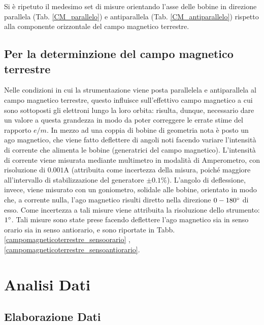 \documentclass[]{article}
\let\oldsection\section%
\renewcommand{\section}{%
	\renewcommand{\theequation}{\thesection.\arabic{equation}}%
	\oldsection}%
\let\oldsubsection\subsection%
\renewcommand{\subsection}{%
	\renewcommand{\theequation}{\thesubsection.\arabic{equation}}%
	\oldsubsection}%
\begin{document}
    Si è ripetuto il medesimo set di misure orientando l'asse delle bobine in direzione parallela (Tab. \ref{CM_parallelo}) e antiparallela (Tab. \ref{CM_antiparallelo}) rispetto alla componente orizzontale del campo magnetico terrestre.

    \subsection{Per la determinzione del campo magnetico terrestre}
    Nelle condizioni in cui la strumentazione viene posta parallelela e antiparallela al campo magnetico terrestre, questo influisce sull'effettivo campo magnetico a cui sono sottoposti gli elettroni lungo la loro orbita: risulta, dunque, necessario dare un valore a questa grandezza in modo da poter correggere le errate stime del rapporto $e/m$. In mezzo ad una coppia di bobine di geometria nota è posto un ago magnetico, che viene fatto deflettere di angoli noti facendo variare l'intensità di corrente che alimenta le bobine (generatrici del campo magnetico). L'intensità di corrente viene misurata mediante multimetro in modalità di Amperometro, con risoluzione di $0.001 \text{A}$ (attribuita come incertezza della misura, poiché maggiore all'intervallo di stabilizzazione del generatore $\pm 0.1 \%$). L'angolo di deflessione, invece, viene misurato con un goniometro, solidale alle bobine, orientato in modo che, a corrente nulla, l'ago magnetico risulti diretto nella direzione $0-180 \degree $ di esso. Come incertezza a tali misure viene attribuita la risoluzione dello strumento: $1 \degree$. Tali misure sono state prese facendo deflettere l'ago magnetico sia in senso orario sia in senso antiorario, e sono riportate in Tabb. \ref{campomagneticoterrestre_sensoorario} , \ref{campomagneticoterrestre_sensoantiorario}.
    

    \section {Analisi Dati}

    \subsection{Elaborazione Dati}
\end{document}
